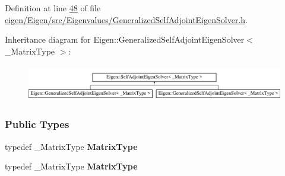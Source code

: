 Definition at line \hyperlink{eigen_2_eigen_2src_2_eigenvalues_2_generalized_self_adjoint_eigen_solver_8h_source_l00048}{48} of file \hyperlink{eigen_2_eigen_2src_2_eigenvalues_2_generalized_self_adjoint_eigen_solver_8h_source}{eigen/\+Eigen/src/\+Eigenvalues/\+Generalized\+Self\+Adjoint\+Eigen\+Solver.\+h}.

Inheritance diagram for Eigen\+:\+:Generalized\+Self\+Adjoint\+Eigen\+Solver$<$ \+\_\+\+Matrix\+Type $>$\+:\begin{figure}[H]
\begin{center}
\leavevmode
\includegraphics[height=1.600000cm]{group___eigenvalues___module}
\end{center}
\end{figure}
\subsubsection*{Public Types}
\begin{DoxyCompactItemize}
\item 
\mbox{\label{group___eigenvalues___module_a8e85caf68c29edc0693fad978d0dff7d}} 
typedef \+\_\+\+Matrix\+Type {\bfseries Matrix\+Type}
\item 
\mbox{\label{group___eigenvalues___module_a8e85caf68c29edc0693fad978d0dff7d}} 
typedef \+\_\+\+Matrix\+Type {\bfseries Matrix\+Type}
\end{DoxyCompactItemize}
